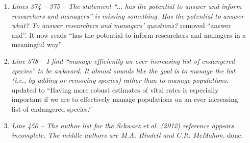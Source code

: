 \documentclass[12pt]{article}
\begin{document}
\begin{enumerate}
\begin{enumerate}
\item {\it Lines 374 – 375 – The statement “... has the potential to answer and inform researchers and managers” is missing something. Has the potential to answer what? To answer researchers and managers’ questions?}
removed ``answer and''. It now reads ``has the potential to inform researchers and managers in a meaningful way''

\item {\it Line 378 – I find “manage efficiently an ever increasing list of endangered species” to be awkward. It almost sounds like the goal is to manage the list (i.e., by adding or removing species) rather than to manage populations.}
updated to ``Having more robust estimates of vital rates is especially important if we are to effectively manage populations on an ever increasing list of endangered species.''

\item {\it Line 450 – The author list for the Schwarz et al. (2012) reference appears incomplete. The middle authors are M.A. Hindell and C.R. McMahon.}
done.
\end{enumerate}

\end{enumerate}



\bigskip
\end{document}
